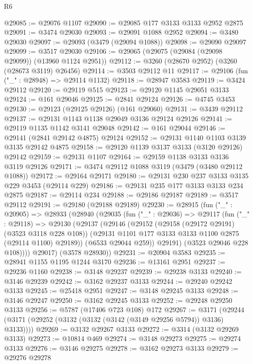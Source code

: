 \begin{lexlean}{R6}
\begin{coremodule}
@29085 := @29076 @1107
@29090 := @29085 @177 @3133 @3133 @2952 @2875
@29091 := @3474 @29030
@29093 := @29091 @1088 @2952
@29094 := @3480 @29030
@29097 := @29093 (@3479 (@29094 @1088))
@29098 := @29090 @29097
@29099 := @3517 @29030
@29106 := @29065 (@29075 (@29084 (@29098 @29099)) (@13960 @1124 @2951))
@29112 := @3260 (@28670 @2952) (@3260 (@28673 @3119) @26456)
@29114 := @3503 @29112 @11
@29117 := @29106 (fun ("_" : @28948) => @29114 @1132)
@29118 := @28947 @3583
@29119 := @3424 @29112
@29120 := @29119 @515
@29123 := @29120 @1145 @29051 @3133
@29124 := @161 @29046
@29125 := @2841 @29124
@29126 := @4745 @3453
@29130 := @29123 (@29125 @29126) (@161 @29060)
@29131 := @3439 @29112
@29137 := @29131 @1143 @1138 @29049 @3136 @29124 @29126
@29141 := @29119 @1135 @1142 @3141 @29048
@29142 := @161 @29044
@29146 := @29141 (@2841 @29142 @4875) @29124
@29152 := @29131 @1140 @1103 @3139 @3135 @29142 @4875
@29158 := @29120 @1139 @3137 @3133 (@3120 @29126) @29142
@29159 := @29131 @1107
@29164 := @29159 @1138 @3133 @3136 @3119 @29126
@29171 := @3474 @29112 @1088 @3119 (@3479 (@3480 @29112 @1088))
@29172 := @29164 @29171
@29180 := @29131 @230 @237 @3133 @3135 @229 @3453 (@29114 @229)
@29186 := @29131 @235 @177 @3133 @3133 @234 @2875
@29187 := @29114 @234
@29188 := @29186 @29187
@29189 := @3517 @29112
@29191 := @29180 (@29188 @29189)
@29230 := @28915
    (fun ("_" : @20905) =>
    @28933
      (@28940
        (@29035
          (fun ("_" : @29036) =>
          @29117
            (fun ("_" : @29118) =>
            @29130
              (@29137
                (@29146
                  (@29152
                    (@29158 (@29172 @29191) (@3523 @3118 @228 @108))
                    (@29131 @1101 @177 @3133 @3133 @1100 @2875 (@29114 @1100) @29189))
                  (@6533 @29044 @259))
                @29191)
              (@3523 @29046 @228 @108))))
        @29017)
      (@3578 @28930))
@29231 := @20904 @3583
@29235 := @28941 @1155 @1195 @1244 @3170
@29236 := @13161 @2951
@29237 := @29236 @1160
@29238 := @3148 @29237
@29239 := @29238 @3133
@29240 := @3146 @29239
@29242 := @3162 @29237 @3133
@29244 := @29240 @29242 @3133
@29245 := @25418 @2951
@29247 := @3148 @29245 @3133
@29248 := @3146 @29247
@29250 := @3162 @29245 @3133
@29252 := @29248 @29250 @3133
@29256 := @5787 (@17406 @723 @108) @172
@29267 := @3171 (@29244 (@3171 (@29252 (@3132 (@3132 (@3142 (@3149 @29256 @5794)) @3136) @3133))))
@29269 := @3132 @29267 @3133
@29272 := @3314 (@3132 @29269 @3133)
@29273 := @10814 @469
@29274 := @3148 @29273
@29275 := @29274 @3133
@29276 := @3146 @29275
@29278 := @3162 @29273 @3133
@29279 := @29276 @29278

\end{coremodule}
\end{lexlean}
